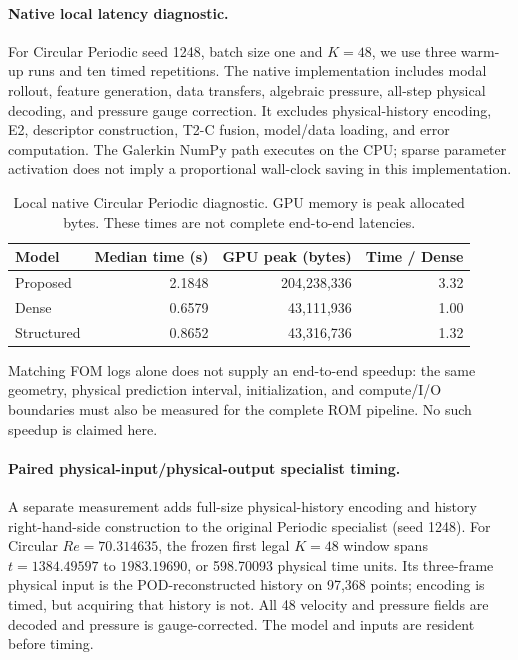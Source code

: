 \documentclass{article}
\providecommand{\DIFaddtex}[1]{{\protect\color{blue} \sf #1}} %
\providecommand{\DIFaddbegin}{} %
\providecommand{\DIFadd}[1]{\texorpdfstring{\DIFaddtex{#1}}{#1}} %
\begin{document}
\paragraph{Native local latency diagnostic.}
For Circular Periodic seed 1248, batch size one and $K=48$, we use three
warm-up runs and ten timed repetitions. The native implementation
includes modal rollout, feature generation, data transfers, algebraic
pressure, all-step physical decoding, and pressure gauge correction.
It excludes physical-history encoding, E2, descriptor construction,
T2-C fusion, model/data loading, and error computation. The Galerkin
NumPy path executes on the CPU; sparse parameter activation does not
imply a proportional wall-clock saving in this implementation.



\begin{table}[H]
\centering
\caption{Local native Circular Periodic diagnostic. GPU memory is peak
allocated bytes. These times are not complete end-to-end latencies.}
\label{tab:local_latency}
\small
\begin{tabular}{@{}lrrr@{}}
\toprule
Model & Median time (s) & GPU peak (bytes) & Time / Dense\\
\midrule
Proposed & 2.1848 & 204,238,336 & 3.32\\
Dense & 0.6579 & 43,111,936 & 1.00\\
Structured & 0.8652 & 43,316,736 & 1.32\\
\bottomrule
\end{tabular}
\end{table}



Matching FOM logs alone does not supply an end-to-end speedup: the same
geometry, physical prediction interval, initialization, and compute/I/O
boundaries must also be measured for the complete ROM pipeline. No such
speedup is claimed here.

\DIFaddbegin \paragraph{\DIFadd{Paired physical-input/physical-output specialist timing.}}
\DIFadd{A separate measurement adds full-size physical-history encoding and
history right-hand-side construction to the original Periodic specialist
(seed 1248). For Circular $Re=70.314635$, the frozen first legal $K=48$
window spans $t=1384.49597$ to $1983.19690$, or 598.70093 physical time
units. Its three-frame physical input is the POD-reconstructed history
on 97,368 points; encoding is timed, but acquiring that history is not.
All 48 velocity and pressure fields are decoded and pressure is
gauge-corrected. The model and inputs are resident before timing.
}
\end{document}

